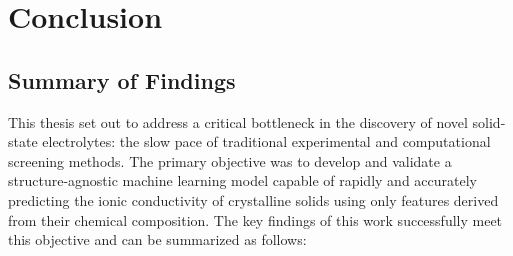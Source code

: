 \chapter{Conclusion}

\section{Summary of Findings}

This thesis set out to address a critical bottleneck in the discovery of novel solid-state electrolytes: the slow pace of traditional experimental and computational screening methods. The primary objective was to develop and validate a structure-agnostic machine learning model capable of rapidly and accurately predicting the ionic conductivity of crystalline solids using only features derived from their chemical composition. The key findings of this work successfully meet this objective and can be summarized as follows:

